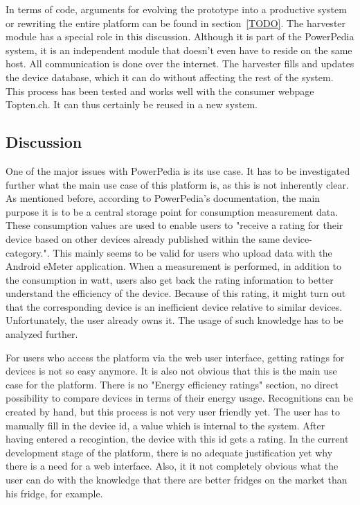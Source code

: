 In terms of code, arguments for evolving the prototype into a productive system or rewriting the entire platform can be found in section~\ref{TODO}. 
The harvester module has a special role in this discussion. Although it is part of the PowerPedia system, it is an independent module that doesn't even have to reside on the same host. All communication is done over the internet. The harvester fills and updates the device database, which it can do without affecting the rest of the system. This process has been tested and works well with the consumer webpage Topten.ch. It can thus certainly be reused in a new system.   

\subsection{Discussion}
One of the major issues with PowerPedia is its use case. It has to be investigated further what the main use case of this platform is, as this is not inherently clear. As mentioned before, according to PowerPedia's documentation, the main purpose it is to be a central storage point for consumption measurement data. These consumption values are used to enable users to "receive a rating for their device based on other devices already published within the same device-category."\cite{merklepp}. This mainly seems to be valid for users who upload data with the Android eMeter application. When a measurement is performed, in addition to the consumption in watt, users also get back the rating information to better understand the efficiency of the device. 
Because of this rating, it might turn out that the corresponding device is an inefficient device relative to similar devices. Unfortunately, the user already owns it. The usage of such knowledge has to be analyzed further.

For users who access the platform via the web user interface, getting ratings for devices is not so easy anymore. It is also not obvious that this is the main use case for the platform. There is no "Energy efficiency ratings" section, no direct possibility to compare devices in terms of their energy usage. Recognitions can be created by hand, but this process is not very user friendly yet. The user has to manually fill in the device id, a value which is internal to the system. After having entered a recogintion, the device with this id gets a rating.  
In the current development stage of the platform, there is no adequate justification yet why there is a need for a web interface. Also, it it not completely obvious what the user can do with the knowledge that there are better fridges on the market than his fridge, for example.

